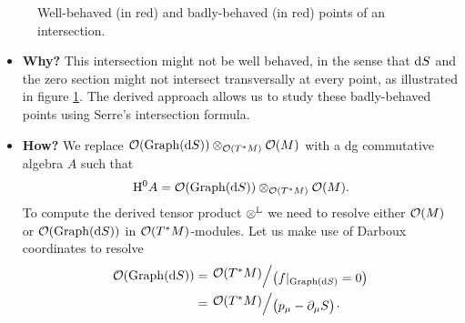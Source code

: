 \begin{example}
\begin{figure}[ht]
    \caption{Well-behaved (in red) and badly-behaved (in red) points of an intersection.}
    \label{fig:bad_intersections}
  \end{figure}
  \begin{itemize}
    \item \textbf{Why?} This intersection might not be well behaved, in the sense that $\mathrm{d} S$ and the zero section might not intersect transversally at every point, as illustrated in figure \ref{fig:bad_intersections}. The derived approach allows us to study these badly-behaved points using Serre's intersection formula.
    \item \textbf{How?} We replace $\mathcal{O} (\operatorname{Graph}(\mathrm{d} S)) \otimes_{\mathcal{O} (T^*M)} \mathcal{O}(M)$ with a dg commutative algebra $A$ such that
    \begin{equation*}
      \mathrm{H}^0 A = \mathcal{O} (\operatorname{Graph}(\mathrm{d} S)) \otimes_{\mathcal{O} (T^*M)} \mathcal{O}(M).
    \end{equation*}
    To compute the derived tensor product $\otimes^{\mathbb{L}}$ we need to resolve either $\mathcal{O}(M)$ or $\mathcal{O}(\operatorname{Graph}(\mathrm{d} S))$ in $\mathcal{O}(T^* M)$-modules. Let us make use of Darboux coordinates to resolve
    \begin{align*}
      \Ocal(\Graph(\drm S)) &=
      \bigslant{\Ocal(T^* M)}{ \bigl( f \vert_{\Graph(\drm S)} = 0 \bigr) } \\
                            &= \bigslant{ \Ocal( T^* M )}{ \bigl( p_{\mu} - \partial_\mu S \bigr) }.
    \end{align*}
  \end{itemize}
\end{example}

